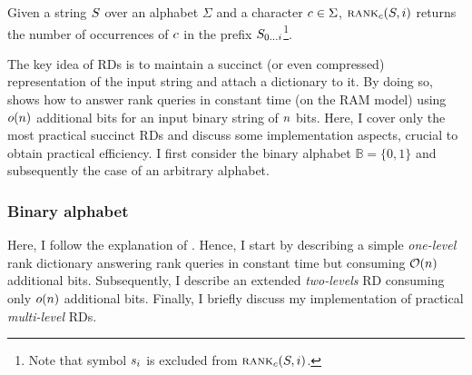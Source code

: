 \begin{definition}
Given a string $S$ over an alphabet $\Sigma$ and a character $c \in \Sigma$, $\textsc{rank}_{c}(S, i)$ returns the number of occurrences of $c$ in the prefix ${S}_{{0}\dots{i}}$\footnote{Note that symbol $\Subscript{\String}{i}$ is excluded from $\textsc{rank}_{c}(S, i)$.}.
\end{definition}

The key idea of RDs is to maintain a succinct (or even compressed) representation of the input string and attach a dictionary to it.
By doing so, \cite{Jacobson1989} shows how to answer rank queries in constant time (on the RAM model) using $o(n)$ additional bits for an input binary string of $n$ bits.
Here, I cover only the most practical succinct RDs and discuss some implementation aspects, crucial to obtain practical efficiency.
I first consider the binary alphabet $\mathbb{B} = \{ 0, 1 \}$ and subsequently the case of an arbitrary alphabet.

\subsubsection{Binary alphabet}
\label{sec:index:rd:binary}

Here, I follow the explanation of \citep{Navarro2007}.
Hence, I start by describing a simple \emph{one-level} rank dictionary answering rank queries in constant time but consuming $\mathcal{O}(n)$ additional bits.
Subsequently, I describe an extended \emph{two-levels} RD consuming only $o(n)$ additional bits.
Finally, I briefly discuss my implementation of practical \emph{multi-level} RDs.

